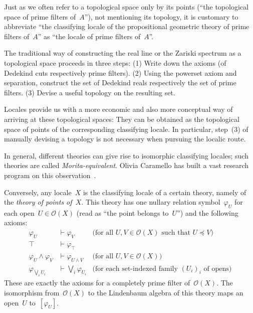 \documentclass{ws-rv9x6}
\renewcommand{\O}{\mathcal{O}}
\renewcommand{\_}{\mathpunct{.}}
\newcommand{\?}{\,{:}\,}
\begin{document}
Just as we often refer to a topological space only by its points (``the
topological space of prime filters of~$A$''), not mentioning its topology, it is
customary to abbreviate ``the classifying locale of the propositional geometric
theory of prime filters of~$A$'' as ``the locale of prime filters of~$A$''.

\begin{remark}\label{rem:traditional-spaces}
The traditional way of constructing the real line or the Zariski
spectrum as a topological space proceeds in three steps: (1) Write down the
axioms (of Dedekind cuts respectively prime filters). (2) Using the powerset
axiom and separation, construct the set of Dedekind reals respectively the set
of prime filters. (3) Devise a useful topology on the resulting set.

Locales provide us with a more economic and also more conceptual way of
arriving at these topological spaces: They can be obtained as the topological
space of points of the corresponding classifying locale. In particular,
step~(3) of manually devising a topology is not necessary when pursuing the
localic route.
\end{remark}

In general, different theories can give rise to isomorphic classifying locales;
such theories are called \emph{Morita-equivalent}. Olivia Caramello has built a vast research program
on this observation~\cite{caramello:tst}.

Conversely, any locale~$X$ is the classifying locale of a certain theory, namely
of the \emph{theory of points of~$X$}. This theory has one nullary relation
symbol~$\varphi_U$ for each open~$U \in \O(X)$ (read as ``the point belongs
to~$U$'') and the following axioms:
\begin{align*}
  \varphi_U &\vdash \varphi_V & \text{(for all~$U,V \in \O(X)$ such that~$U \preceq V$)} \\
  \top &\vdash \varphi_\top \\
  \varphi_U \wedge \varphi_V &\vdash \varphi_{U \wedge V} & \text{(for all~$U,V \in \O(X)$)} \\
  \varphi_{\bigvee_i U_i} &\vdash \bigvee_i \varphi_{U_i} & \text{(for each set-indexed family~$(U_i)_i$ of opens)}
\end{align*}
These are exactly the axioms for a completely prime filter of~$\O(X)$. The
isomorphism from~$\O(X)$ to the Lindenbaum algebra of this theory maps an
open~$U$ to~$[\varphi_U]$.
\end{document}
